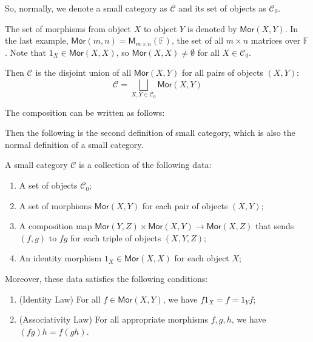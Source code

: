 \documentclass[
	11pt, %
	fleqn, %
	a4paper, %
]{LegrandOrangeBook}
\newcommand{\F}{\mathbb{F}} %
\newcommand{\M}[2]{\mathsf{M}_{#1}(#2)} %
\newcommand{\C}{\mathcal{C}} %
\newcommand{\Mor}{\mathsf{Mor}} %
\begin{document}
So, normally, we denote a small category as $\C$ and its set of objects as $\C_0$.

\begin{remark}
    The set of morphisms from object $X$ to object $Y$ is denoted by $\Mor(X, Y)$. In the last example, $\Mor(m, n) = \M{m \times n}{\F}$, the set of all $m \times n$ matrices over $\F$. Note that $1_X \in \Mor(X, X)$, so $\Mor(X, X) \neq \emptyset$ for all $X \in \C_0$.
\end{remark}

Then $\C$ is the disjoint union of all $\Mor(X, Y)$ for all pairs of objects $(X, Y)$:
\[
    \C = \bigsqcup_{X, Y \in \C_0} \Mor(X, Y)
\]

\begin{remark}
    The composition can be written as follows:
    \begin{center}
    \end{center}
\end{remark}

Then the following is the second definition of small category, which is also the normal definition of a small category.

\begin{definition}
    A small category $\C$ is a collection of the following data:
    \begin{enumerate}
        \item A set of objects $\C_0$;
        \item A set of morphisms $\Mor(X, Y)$ for each pair of objects $(X, Y)$;
        \item A composition map $\Mor(Y, Z) \times \Mor(X, Y) \to \Mor(X, Z)$ that sends $(f, g)$ to $fg$ for each triple of objects $(X, Y, Z)$;
        \item An identity morphism $1_X \in \Mor(X, X)$ for each object $X$;
    \end{enumerate}
    Moreover, these data satisfies the following conditions:
    \begin{enumerate}[label=(\alph*)]
        \item (Identity Law) For all $f \in \Mor(X, Y)$, we have $f 1_X = f = 1_Y f$;
        \item (Associativity Law) For all appropriate morphisms $f, g, h$, we have $(fg)h = f(gh)$.
    \end{enumerate}
\end{definition}
\end{document}
